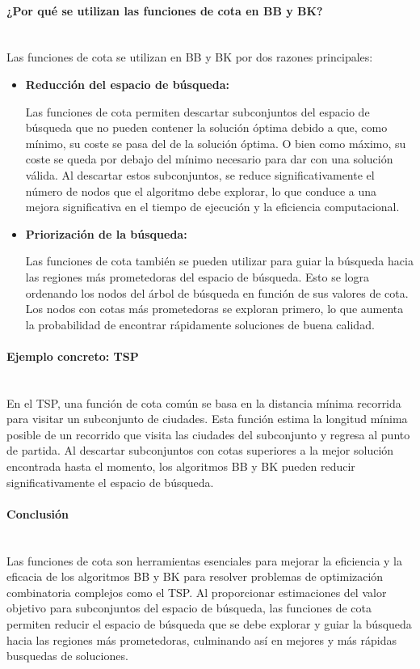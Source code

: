 \documentclass{article}
\newcommand{\myparagraph}[1]{\paragraph{#1}\mbox{}\\}
\begin{document}
\myparagraph{¿Por qué se utilizan las funciones de cota en BB y BK?}

Las funciones de cota se utilizan en BB y BK por dos razones principales:
\begin{itemize}
    \item \textbf{Reducción del espacio de búsqueda:}

Las funciones de cota permiten descartar subconjuntos del espacio de búsqueda que no pueden contener la solución óptima debido a que, como mínimo, su coste se pasa del de la solución óptima. O bien como máximo, su coste se queda por debajo del mínimo necesario para dar con una solución válida. Al descartar estos subconjuntos, se reduce significativamente el número de nodos que el algoritmo debe explorar, lo que conduce a una mejora significativa en el tiempo de ejecución y la eficiencia computacional.

\item\textbf{Priorización de la búsqueda:}

Las funciones de cota también se pueden utilizar para guiar la búsqueda hacia las regiones más prometedoras del espacio de búsqueda. Esto se logra ordenando los nodos del árbol de búsqueda en función de sus valores de cota. Los nodos con cotas más prometedoras se exploran primero, lo que aumenta la probabilidad de encontrar rápidamente soluciones de buena calidad.
\end{itemize}
\myparagraph{Ejemplo concreto: TSP}

En el TSP, una función de cota común se basa en la distancia mínima recorrida para visitar un subconjunto de ciudades. Esta función estima la longitud mínima posible de un recorrido que visita las ciudades del subconjunto y regresa al punto de partida. Al descartar subconjuntos con cotas superiores a la mejor solución encontrada hasta el momento, los algoritmos BB y BK pueden reducir significativamente el espacio de búsqueda.

\myparagraph{Conclusión}

Las funciones de cota son herramientas esenciales para mejorar la eficiencia y la eficacia de los algoritmos BB y BK para resolver problemas de optimización combinatoria complejos como el TSP. Al proporcionar estimaciones del valor objetivo para subconjuntos del espacio de búsqueda, las funciones de cota permiten reducir el espacio de búsqueda que se debe explorar y guiar la búsqueda hacia las regiones más prometedoras, culminando así en mejores y más rápidas busquedas de soluciones.
\end{document}
